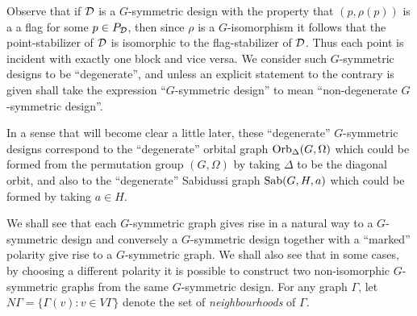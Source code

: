 Observe that if $\mathcal{D}$ is a $G$-symmetric design with the property
that $(p, \rho(p))$ is a a flag for some $p \in P_{\mathcal{D}}$,
then since $\rho$ is a $G$-isomorphism it follows
that the point-stabilizer of $\mathcal{D}$ is isomorphic to the flag-stabilizer of $\mathcal{D}$.
Thus each point is incident with exactly one block
and vice versa.
We consider such $G$-symmetric designs to be ``degenerate'',
and unless an explicit statement to the contrary is given shall
take the expression ``$G$-symmetric design''
to mean ``non-degenerate $G$-symmetric design''.

In a sense that will become clear a little later,
these ``degenerate'' $G$-symmetric
designs correspond to the ``degenerate'' orbital graph $\operatorname{Orb}_\Delta(G,\Omega)$
which could be formed from the permutation group $(G, \Omega)$
by taking $\Delta$ to be the diagonal orbit,
and also to the ``degenerate'' Sabidussi graph $\operatorname{Sab}(G,H,a)$
which could be formed by taking $a \in H$.
\hfill \break

We shall see that each $G$-symmetric graph
gives rise in a natural way to a $G$-symmetric design
and conversely a $G$-symmetric design together
with a ``marked'' polarity give rise to a $G$-symmetric graph.
We shall also see that in some cases, by choosing a different
polarity it is possible to construct two non-isomorphic $G$-symmetric
graphs from the same $G$-symmetric design.
For any graph $\Gamma$, let $N \Gamma = \{ \Gamma(v) : v \in V \Gamma \}$
denote the set of {\it neighbourhoods} of $\Gamma$.

